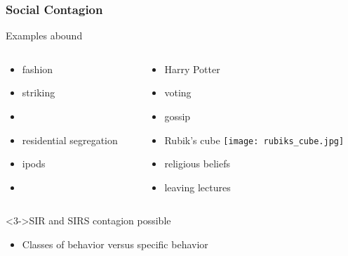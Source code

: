 \begin{frame}
  \frametitle{Social Contagion}

  \begin{block}{Examples abound}
    \begin{columns}
      \begin{column}{0.5\textwidth}
        \begin{itemize}
        \item<1->  fashion
        \item<1->  striking
        \item<1-> \cite{christakis2008a}
        \item<1->  residential segregation\cite{schelling1971a}
        \item<1->  ipods                                   
        \item<1-> \cite{christakis2007a}
        \end{itemize}
      \end{column}
      \begin{column}{0.5\textwidth}
        \begin{itemize}
        \item<1-> Harry Potter         
        \item<1-> voting               
        \item<1-> gossip               
        \item<1-> Rubik's cube \texttt{[image: rubiks\_cube.jpg]}
        \item<1-> religious beliefs    
        \item<2-> \alert{leaving lectures}
        \end{itemize}
      \end{column}
    \end{columns}
  \end{block}

  \begin{block}<3->{SIR and SIR\alert{S} contagion possible}
    \begin{itemize}
    \item<3-> Classes of behavior versus specific behavior
    \end{itemize}
  \end{block}

\end{frame}


